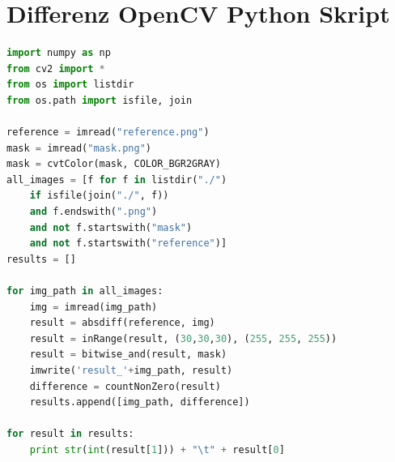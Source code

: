\chapter{Differenz OpenCV Python Skript}

\begin{lstlisting}[mathescape,caption=Python Implementierung der Bilddifferenz, label=lst:compare, language=Python]
import numpy as np
from cv2 import *
from os import listdir
from os.path import isfile, join

reference = imread("reference.png")
mask = imread("mask.png")
mask = cvtColor(mask, COLOR_BGR2GRAY)
all_images = [f for f in listdir("./") 
	if isfile(join("./", f)) 
	and f.endswith(".png") 
	and not f.startswith("mask") 
	and not f.startswith("reference")]
results = []

for img_path in all_images:
    img = imread(img_path)
    result = absdiff(reference, img)
    result = inRange(result, (30,30,30), (255, 255, 255))
    result = bitwise_and(result, mask)
    imwrite('result_'+img_path, result)
    difference = countNonZero(result)
    results.append([img_path, difference])

for result in results:
    print str(int(result[1])) + "\t" + result[0]  

\end{lstlisting}